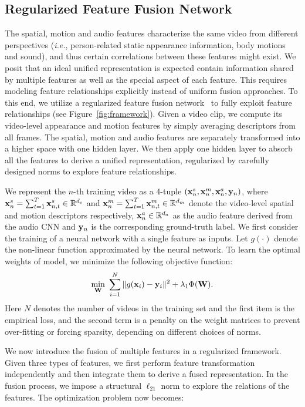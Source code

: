 \documentclass[journal]{IEEEtran}
\makeatletter
\newcommand*{\ie}{\emph{i.e.}\@\xspace}
\makeatother
\begin{document}
\subsection{Regularized Feature Fusion Network}
The spatial, motion and audio features characterize the same video from different perspectives (\ie, person-related static appearance information, body motions and sound), and thus certain correlations between these features might exist. We posit that an ideal unified representation is expected contain information shared by multiple features as well as the special aspect of each feature. This requires modeling feature relationships explicitly instead of uniform fusion approaches. To this end, we utilize a regularized feature fusion network~\cite{TPAMI-fcvid} to fully exploit feature relationships (see Figure~\ref{fig:framework}). Given a video clip, we compute its video-level appearance and motion features by simply averaging descriptors from all frames. The spatial, motion and audio features are separately transformed into a higher space with one hidden layer. We then apply one hidden layer to absorb all the features to derive a unified representation, regularized by carefully designed norms to explore feature relationships.

We represent the $n$-th training video as a 4-tuple $({\bf x}^s_n, {\bf x}^m_n, {\bf x}^a_n, {\bf y}_n)$, where ${\bf x}^s_n = \sum_{t=1}^T {{\bf x}^s_{n,t}}\in \mathbb{R}^{d_s}$ and ${\bf x}^m_n = \sum_{t=1}^T {{\bf x}^m_{n,t}} \in \mathbb{R}^{d_m}$ denote the video-level spatial and motion descriptors respectively, ${\bf x}^a_n \in \mathbb{R}^{d_a}$ as the audio feature derived from the audio CNN and ${\bf y}_n$ is the corresponding ground-truth label. We first consider the training of a neural network with a single feature as inputs. Let $g(\cdot)$ denote the non-linear function approximated by the neural network. To learn the optimal weights of model, we minimize the following objective function:
\begin{equation}
\label{eq:nn}
    \min_{{\bf W}} ~\sum_{i=1}^{N} \|  g({\bf x}_{i})-{\bf y}_i \|^2 + \lambda_1 \Phi({\bf W}).
\end{equation}
Here $N$ denotes the number of videos in the training set and the first item is the empirical loss, and the second term is a penalty on the weight matrices to prevent over-fitting or forcing sparsity, depending on different choices of norms. 

We now introduce the fusion of multiple features in a regularized framework. Given three types of features, we first perform feature transformation independently and then integrate them to derive a fused representation. In the fusion process, we impose a structural $\ell_{21}$ norm to explore the relations of the features. The optimization problem now becomes:
\end{document}
